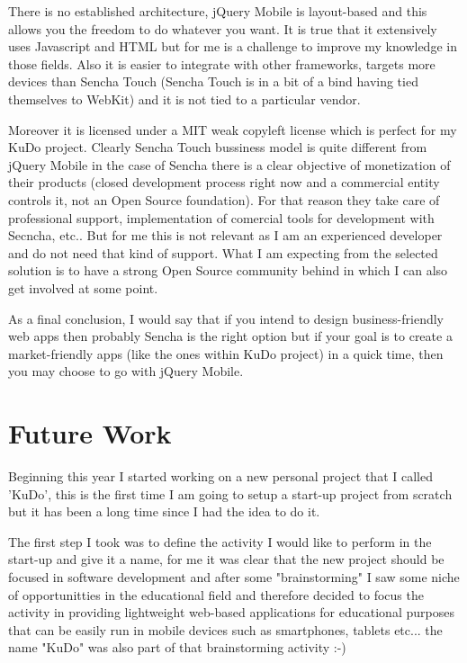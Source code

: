 \documentclass[a4paper,12pt]{book}
\begin{document}
There is no established architecture, jQuery Mobile is layout-based and this allows you the freedom to do whatever you want. It is true that it extensively uses Javascript and HTML but for me is a challenge to improve my knowledge in those fields. Also it is easier to integrate with other frameworks, targets more devices than Sencha Touch (Sencha Touch is in a bit of a bind having tied themselves to WebKit) and it is not tied to a particular vendor.

Moreover it is licensed under a MIT weak copyleft license which is perfect for my KuDo project. Clearly Sencha Touch bussiness model is quite different from jQuery Mobile in the case of Sencha there is a clear objective of monetization of their products (closed development process right now and a commercial entity controls it, not an Open Source foundation). For that reason they take care of professional support, implementation of comercial tools for development with Secncha, etc.. But for me this is not relevant as I am an experienced developer and do not need that kind of support. What I am expecting from the selected solution is to have a strong Open Source community behind in which I can also get involved at some point.

As a final conclusion, I would say that if you intend to design business-friendly web apps then probably Sencha is the right option but if your goal is to create a market-friendly apps (like the ones within KuDo project) in a quick time, then you may choose to go with jQuery Mobile.


\chapter{Future Work}
\label{chap:future}

Beginning this year I started working on a new personal project that I called 'KuDo', this is the first time I am going to setup a start-up project from scratch but it has been a long time since I had the idea to do it. 

The first step I took was to define the activity I would like to perform in the start-up  and give it a name, for me it was clear that the new project should be focused in software development and after some "brainstorming" I saw some niche of opportunitties in the educational field and therefore decided to focus the activity in providing lightweight web-based applications for educational purposes that can be easily run in mobile devices such as smartphones, tablets etc... the name "KuDo" was also part of that brainstorming activity :-)
\end{document}
